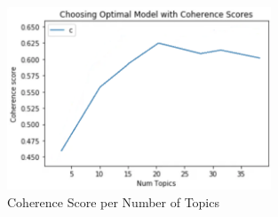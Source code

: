 \documentclass[12pt]{article}
\begin{document}
\begin{figure}
\begin{center}
\includegraphics[width=0.7\textwidth]{figures/image17.png}
\caption{Coherence Score per Number of Topics}
\label{fig:img_coherence_score}
\end{center}
\end{figure}
\end{document}
